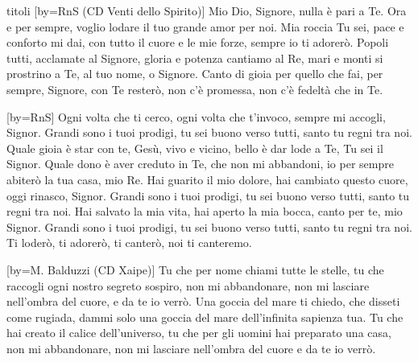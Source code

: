 \begin{songs}{titoli}
[by={RnS (CD Venti dello Spirito)}]
\beginverse
Mio Dio, Signore, nulla è pari a Te.
Ora e per sempre, voglio lodare il tuo grande amor per noi.
Mia roccia Tu sei, pace e conforto mi dai,
con tutto il cuore e le mie forze, sempre io ti adorerò.
\endverse
\beginchorus
Popoli tutti, acclamate al Signore,
gloria e potenza cantiamo al Re,
mari e monti si prostrino a Te, al tuo nome, o Signore.
Canto di gioia per quello che fai,
per sempre, Signore, con Te resterò,
non c'è promessa, non c'è fedeltà che in Te.
\endchorus
\endsong

[by={RnS}]
\beginverse
Ogni volta che ti cerco, ogni volta che t'invoco,
sempre mi accogli, Signor.
Grandi sono i tuoi prodigi, tu sei buono verso tutti,
santo tu regni tra noi.
\endverse
\beginchorus
Quale gioia è star con te, Gesù, vivo e vicino,
bello è dar lode a Te, Tu sei il Signor.
Quale dono è aver creduto in Te, che non mi abbandoni,
io per sempre abiterò la tua casa, mio Re.
\endchorus
\beginverse
Hai guarito il mio dolore, hai cambiato questo cuore,
oggi rinasco, Signor.
Grandi sono i tuoi prodigi, tu sei buono verso tutti,
santo tu regni tra noi.
\endverse
\beginverse
Hai salvato la mia vita, hai aperto la mia bocca,
canto per te, mio Signor.
Grandi sono i tuoi prodigi, tu sei buono verso tutti,
santo tu regni tra noi.
\endverse
\beginverse*
Ti loderò, ti adorerò, ti canterò,
noi ti canteremo.
\endverse
\endsong

[by={M. Balduzzi (CD Xaipe)}]
\beginverse
Tu che per nome chiami tutte le stelle,
tu che raccogli ogni nostro segreto sospiro,
non mi abbandonare,
non mi lasciare nell'ombra del cuore,
e da te io verrò.
\endverse
\beginchorus
Una goccia del mare ti chiedo,
che disseti come rugiada,
dammi solo una goccia del mare
dell'infinita sapienza tua.
\endchorus
\beginverse
Tu che hai creato il calice dell'universo,
tu che per gli uomini hai preparato una casa,
non mi abbandonare,
non mi lasciare nell'ombra del cuore
e da te io verrò.
\endverse
\endsong


\end{songs}
